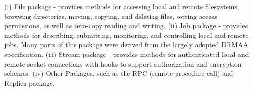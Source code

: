 \documentclass{rspublic}
\begin{document}
(i) File package - provides methods for accessing local and remote
filesystems, browsing directories, moving, copying, and deleting
files, setting access permissions, as well as zero-copy reading and
writing. (ii) Job package - provides methods for describing,
submitting, monitoring, and controlling local and remote jobs. Many
parts of this package were derived from the largely adopted DRMAA
specification. (iii) Stream package - provides methods for
authenticated local and remote socket connections with hooks to
support authorization and encryption schemes. (iv) Other Packages,
such as the RPC (remote procedure call) and Replica package.

\end{document}
